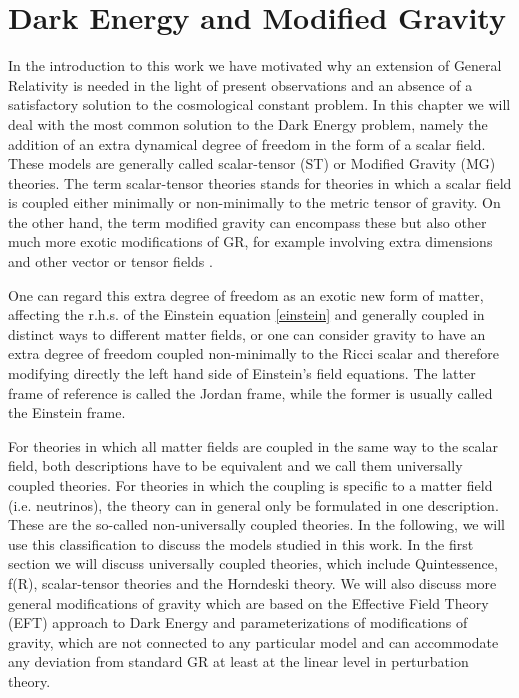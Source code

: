 \chapter{Dark Energy and Modified Gravity} %

\label{DE-MG} %




In the introduction to this work we have motivated why an extension of General Relativity
is needed in the light of present observations and an absence of a satisfactory
solution to the cosmological constant problem.
In this chapter we will deal with the most common solution to the Dark Energy problem,
namely the addition of an extra dynamical degree of freedom in the form of a scalar field.
These models are generally called scalar-tensor (ST) or Modified Gravity (MG) theories. 
The term scalar-tensor theories stands for theories in which a scalar field is coupled either minimally or non-minimally
to the metric tensor of gravity. On the other hand, the term 
modified gravity can encompass these but also other much more exotic modifications of GR, 
for example involving extra dimensions and other 
vector or tensor fields \cite{cite, bigravity, LH vector theory, dgp}. 

One can regard this extra degree of freedom as an exotic new form of matter, affecting the 
r.h.s. of the Einstein equation \ref{einstein} and generally coupled in distinct ways to different matter fields, 
or one can consider gravity to have an extra degree of freedom coupled non-minimally to the 
Ricci scalar and therefore modifying 
directly the left hand side of Einstein's field equations. The latter frame of reference
is called the Jordan frame, while the former is usually called the Einstein frame.

For theories in which all matter fields are coupled in the same way to the scalar field, both descriptions
have to be equivalent and we call them universally coupled theories. 
For theories in which the coupling is specific to a matter field (i.e. neutrinos), the theory can in general only be formulated
in one description. These are the so-called non-universally coupled theories.
In the following, we will use this classification to discuss the models studied in this work.
In the first section we will discuss universally coupled theories, which include Quintessence, f(R),
scalar-tensor theories and the Horndeski theory. We will also discuss
more general modifications of gravity which are based on the Effective Field Theory (EFT) approach to
Dark Energy and parameterizations of modifications of gravity, which
are not connected to any particular model and can accommodate any deviation from standard GR at least at the linear 
level in perturbation theory.

